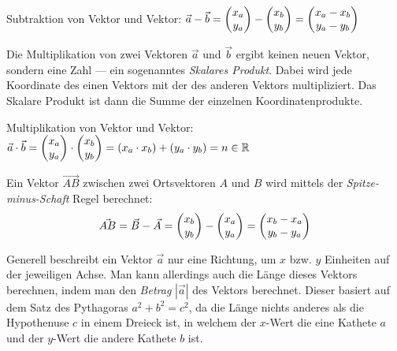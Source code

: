 Subtraktion von Vektor und Vektor: $\vec{a} - \vec{b} = \begin{pmatrix}x_{a}\\y_{a}\end{pmatrix} - \begin{pmatrix}x_{b}\\y_{b}\end{pmatrix} = \begin{pmatrix}x_{a} - x_{b} \\ y_{a} - y_{b}\end{pmatrix}$

Die Multiplikation von zwei Vektoren $\vec{a}$ und $\vec{b}$ ergibt keinen neuen Vektor, sondern eine Zahl --- ein sogenanntes \emph{Skalares Produkt}. Dabei wird jede Koordinate des einen Vektors mit der des anderen Vektors multipliziert. Das Skalare Produkt ist dann die Summe der einzelnen Koordinatenprodukte.

Multiplikation von Vektor und Vektor: $\vec{a} \cdot \vec{b} = \begin{pmatrix}x_{a} \\ y_{a}\end{pmatrix} \cdot \begin{pmatrix}x_{b} \\ y_{b}\end{pmatrix} = (x_{a} \cdot x_{b}) + (y_{a} \cdot y_{b}) = n \in \mathbb{R}$

\pagebreak



Ein Vektor $\vec{AB}$ zwischen zwei Ortsvektoren $A$ und $B$ wird mittels der \emph{Spitze-minus-Schaft} Regel berechnet:
$$ \vec{AB} = \vec{B} - \vec{A} = \begin{pmatrix}x_{b}\\y_{b}\end{pmatrix} - \begin{pmatrix}x_{a}\\y_{a}\end{pmatrix} = \begin{pmatrix}x_{b}-x_{a}\\y_{b}-y_{a}\end{pmatrix}$$


Generell beschreibt ein Vektor $\vec{a}$ nur eine Richtung, um $x$ bzw. $y$ Einheiten auf der jeweiligen Achse. Man kann allerdings auch die L\"{a}nge dieses Vektors berechnen, indem man den \emph{Betrag} $|\vec{a}|$ des Vektors berechnet. Dieser basiert auf dem Satz des Pythagoras $a^2 + b^2 = c^2$, da die L\"{a}nge nichts anderes als die Hypothenuse $c$ in einem Dreieck ist, in welchem der $x$-Wert die eine Kathete $a$ und der $y$-Wert die andere Kathete $b$ ist.

\begin{figure}[h!]
  \centering
  \large
\end{figure}

